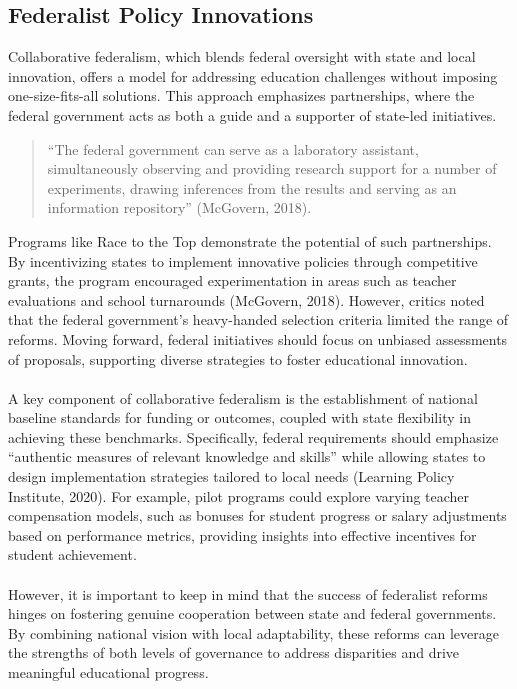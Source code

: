 \documentclass[11pt]{extarticle}
\begin{document}
\subsection{Federalist Policy Innovations}
Collaborative federalism, which blends federal oversight with state and local innovation, offers a model for addressing education challenges without imposing one-size-fits-all solutions. This approach emphasizes partnerships, where the federal government acts as both a guide and a supporter of state-led initiatives. 
\begin{quote}
  ``The federal government can serve as a laboratory assistant, simultaneously observing and providing research support for a number of experiments, drawing inferences from the results and serving as an information repository” (McGovern, 2018).
\end{quote}
Programs like Race to the Top demonstrate the potential of such partnerships. By incentivizing states to implement innovative policies through competitive grants, the program encouraged experimentation in areas such as teacher evaluations and school turnarounds (McGovern, 2018). However, critics noted that the federal government’s heavy-handed selection criteria limited the range of reforms. Moving forward, federal initiatives should focus on unbiased assessments of proposals, supporting diverse strategies to foster educational innovation.\\
\\
A key component of collaborative federalism is the establishment of national baseline standards for funding or outcomes, coupled with state flexibility in achieving these benchmarks. Specifically, federal requirements should emphasize ``authentic measures of relevant knowledge and skills” while allowing states to design implementation strategies tailored to local needs (Learning Policy Institute, 2020). For example, pilot programs could explore varying teacher compensation models, such as bonuses for student progress or salary adjustments based on performance metrics, providing insights into effective incentives for student achievement.\\
\\
However, it is important to keep in mind that the success of federalist reforms hinges on fostering genuine cooperation between state and federal governments. By combining national vision with local adaptability, these reforms can leverage the strengths of both levels of governance to address disparities and drive meaningful educational progress.
\end{document}

